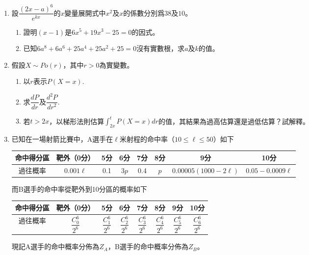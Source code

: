 \documentclass[12pt]{article}
\begin{document}
    \begin{enumerate}
        \item 設$\dfrac{(2x-a)^6}{e^{kx}}$的$x$變量展開式中$x^2$及$x$的係數分別爲$38$及$10$。
        \begin{enumerate}
            \item 證明$(x-1)$是$6x^5+19x^3-25=0$的因式。
            \item 已知$6a^8+6a^6+25a^4+25a^2+25=0$沒有實數根，求$a$及$k$的值。
        \end{enumerate}
        \item 假設$X\sim Po(r)$，其中$r>0$為實變數。\begin{enumerate}
            \item 以$r$表示$P(X=x)$.
            \item 求$\dfrac{dP}{dr}$及$\dfrac{d^2P}{dr^2}$.
            \item 若$t>2x$，以梯形法則估算$\int_{2x}^{t}P(X=x) dr$的值，其結果為過高估算還是過低估算？試解釋。
        \end{enumerate}
        \item 已知在一場射箭比賽中，A選手在$\ell$米射程的命中率（$10\leq \ell \leq 50$）如下\begin{center}
            \begin{tabular}{|c||c|c|c|c|c|c|c|}
                \hline
                命中得分區&靶外（0分）&5分&6分&7分&8分&9分&10分\\
                \hline
                過往概率&$0.001\ell$&0.1&$3p$&0.4&$p$&$0.00005(1000-2\ell)$&$0.05-0.0009\ell$\\
                \hline
            \end{tabular}
        \end{center}
        而B選手的命中率從靶外到10分區的概率如下\begin{center}
            \begin{tabular}{|c||c|c|c|c|c|c|c|}
                \hline
                命中得分區&靶外（0分）&5分&6分&7分&8分&9分&10分\\
                \hline
                過往概率&$\dfrac{C_0^6}{2^6}$&$\dfrac{C_1^6}{2^6}$&$\dfrac{C_2^6}{2^6}$&$\dfrac{C_3^6}{2^6}$&$\dfrac{C_4^6}{2^6}$&$\dfrac{C_5^6}{2^6}$&$\dfrac{C_6^6}{2^6}$\\
                \hline
            \end{tabular}
        \end{center}現記A選手的命中概率分佈為$Z_A$，B選手的命中概率分佈為$Z_B$。\begin{enumerate}

\end{enumerate}
\end{enumerate}
\end{document}
